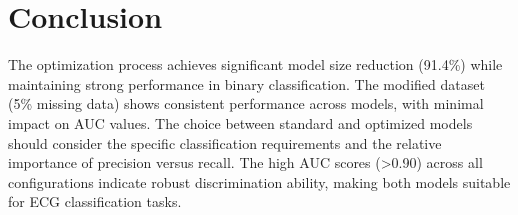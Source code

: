 \documentclass[12pt,a4paper]{article}
\begin{document}
\section{Conclusion}
The optimization process achieves significant model size reduction (91.4\%) while maintaining strong performance in binary classification. The modified dataset (5\% missing data) shows consistent performance across models, with minimal impact on AUC values. The choice between standard and optimized models should consider the specific classification requirements and the relative importance of precision versus recall. The high AUC scores (>0.90) across all configurations indicate robust discrimination ability, making both models suitable for ECG classification tasks.
\end{document}

